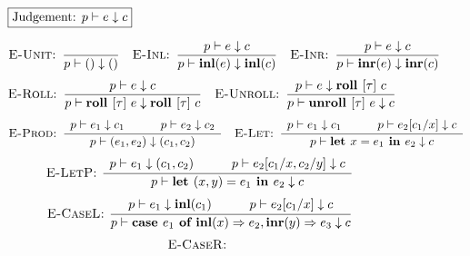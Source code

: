 \begin{figure}[ht]
\setlength\fboxsep{0.15cm}
\noindent$\boxed{\text{Judgement: } p \vdash e \downarrow c}$

\begin{align*}
  \textsc{E-Unit: }
    \dfrac
      {}
      {p \vdash () \downarrow ()} &&
  \textsc{E-Inl: }
    \dfrac
      {p \vdash e \downarrow c}
      {p \vdash \textbf{inl}(e) \downarrow \textbf{inl}(c)} &&
  \textsc{E-Inr: }
    \dfrac
      {p \vdash e \downarrow c}
      {p \vdash  \textbf{inr}(e) \downarrow \textbf{inr}(c)}
\end{align*}
\alignspace
\begin{align*}
  \textsc{E-Roll: }
    \dfrac
      {p \vdash e \downarrow c}
      {p \vdash \textbf{roll } [\tau]\ e \downarrow \textbf{roll } [\tau]\ c} &&
  \textsc{E-Unroll: }
    \dfrac
      {p \vdash e \downarrow \textbf{roll } [\tau]\ c}
      {p \vdash \textbf{unroll } [\tau]\ e \downarrow c}
\end{align*}
\alignspace
\begin{align*}
  \textsc{E-Prod: }
    \dfrac
      {\begin{array}{ccc}
       p \vdash e_1 \downarrow c_1 & \quad &
       p \vdash e_2 \downarrow c_2
       \end{array}}
      {p \vdash (e_1, e_2) \downarrow (c_1, c_2)} &&
  \textsc{E-Let: }
    \dfrac
      {\begin{array}{ccc}
       p \vdash e_1 \downarrow c_1 & \quad &
       p \vdash e_2[c_1/x] \downarrow c
       \end{array}}
      {p \vdash \textbf{let $x = e_1$ in $e_2$} \downarrow c}
\end{align*}
\alignspace
\begin{align*}
  \textsc{E-LetP: }
    \dfrac
      {\begin{array}{ccc}
       p \vdash e_1 \downarrow (c_1,c_2) & \quad &
       p \vdash e_2[c_1 / x, c_2 / y] \downarrow c
       \end{array}}
      {p \vdash \textbf{let $(x,y) = e_1$ in $e_2$} \downarrow c}
\end{align*}
\alignspace
\begin{align*}
  \textsc{E-CaseL: }
    \dfrac
      {\begin{array}{ccc}
       p \vdash e_1 \downarrow \textbf{inl}(c_1) & \quad &
       p \vdash e_2 [c_1 / x] \downarrow c
       \end{array}}
      {p \vdash \textbf{case } e_1 \textbf{ of } \textbf{inl}(x) \Rightarrow e_2, \textbf{inr}(y) \Rightarrow e_3 \downarrow c}
\end{align*}
\alignspace
\begin{align*}
  \textsc{E-CaseR: }

\end{align*}
\end{figure}

